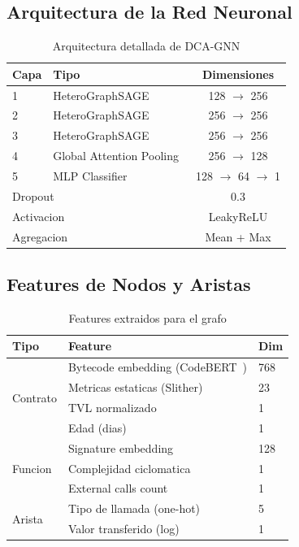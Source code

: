 \documentclass[11pt]{article}
\theoremstyle{definition}
\theoremstyle{plain}
\theoremstyle{remark}
\begin{document}
\subsection{Arquitectura de la Red Neuronal}

\begin{table}[H]
\centering
\caption{Arquitectura detallada de DCA-GNN}
\label{tab:gnn_architecture}
\begin{tabular}{llc}
\toprule
\textbf{Capa} & \textbf{Tipo} & \textbf{Dimensiones} \\
\midrule
1 & HeteroGraphSAGE~\cite{hamilton2017inductive} & 128 $\rightarrow$ 256 \\
2 & HeteroGraphSAGE & 256 $\rightarrow$ 256 \\
3 & HeteroGraphSAGE & 256 $\rightarrow$ 256 \\
4 & Global Attention Pooling~\cite{li2016gated} & 256 $\rightarrow$ 128 \\
5 & MLP Classifier & 128 $\rightarrow$ 64 $\rightarrow$ 1 \\
\midrule
\multicolumn{2}{l}{Dropout} & 0.3 \\
\multicolumn{2}{l}{Activacion} & LeakyReLU \\
\multicolumn{2}{l}{Agregacion} & Mean + Max \\
\bottomrule
\end{tabular}
\end{table}

\subsection{Features de Nodos y Aristas}

\begin{table}[H]
\centering
\caption{Features extraidos para el grafo}
\label{tab:gnn_features}
\begin{tabular}{lll}
\toprule
\textbf{Tipo} & \textbf{Feature} & \textbf{Dim} \\
\midrule
\multirow{4}{*}{Contrato} & Bytecode embedding (CodeBERT~\cite{feng2020codebert}) & 768 \\
 & Metricas estaticas (Slither) & 23 \\
 & TVL normalizado & 1 \\
 & Edad (dias) & 1 \\
\midrule
\multirow{3}{*}{Funcion} & Signature embedding & 128 \\
 & Complejidad ciclomatica & 1 \\
 & External calls count & 1 \\
\midrule
\multirow{2}{*}{Arista} & Tipo de llamada (one-hot) & 5 \\
 & Valor transferido (log) & 1 \\
\bottomrule
\end{tabular}
\end{table}
\end{document}
